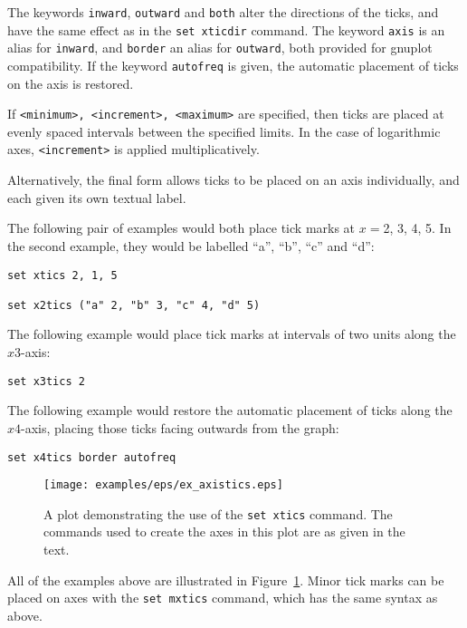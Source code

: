 \documentclass[a4paper,onecolumn,11pt]{book}
\begin{document}
The keywords \texttt{inward}, \texttt{outward} and \texttt{both} alter the
directions of the ticks, and have the same effect as in the \texttt{set
xticdir} command. The keyword \texttt{axis} is an alias for \texttt{inward},
and \texttt{border} an alias for \texttt{outward}, both provided for gnuplot
compatibility. If the keyword \texttt{autofreq} is given, the automatic
placement of ticks on the axis is restored.

If \texttt{<minimum>, <increment>, <maximum>} are specified, then ticks are
placed at evenly spaced intervals between the specified limits. In the case of
logarithmic axes, \texttt{<increment>} is applied multiplicatively.

Alternatively, the final form allows ticks to be placed on an axis
individually, and each given its own textual label.

The following pair of examples would both place tick marks at $x=$2, 3, 4, 5.
In the second example, they would be labelled ``a'', ``b'', ``c'' and ``d'':

\begin{verbatim}
set xtics 2, 1, 5

set x2tics ("a" 2, "b" 3, "c" 4, "d" 5)
\end{verbatim}

The following example would place tick marks at intervals of two units along
the $x3$-axis:

\begin{verbatim}
set x3tics 2
\end{verbatim}

The following example would restore the automatic placement of ticks along the
$x4$-axis, placing those ticks facing outwards from the graph:

\begin{verbatim}
set x4tics border autofreq
\end{verbatim}

\begin{figure}
\begin{center}
\texttt{[image: examples/eps/ex\_axistics.eps]}
\end{center}
\caption{A plot demonstrating the use of the {\tt set xtics} command. The commands used to create the axes in this plot are as given in the text.}
\label{fig:ex_axistics}
\end{figure}


All of the examples above are illustrated in Figure~\ref{fig:ex_axistics}.
Minor tick marks can be placed on axes with the \texttt{set mxtics} command,
which has the same syntax as above.
\end{document}

